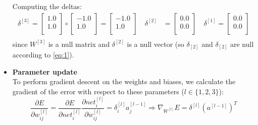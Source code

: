 \documentclass{exam}
\begin{document}
\begin{questions}
\begin{itemize}
\begin{equation}
                \label{eq:2}
            \end{equation}
            Computing the deltas:
            \begin{align*}
                \delta^{[3]} = 
                \begin{bmatrix}
                    1.0  \\
                    1.0 \\
                \end{bmatrix} \circ
                \begin{bmatrix}
                    -1.0  \\
                    1.0  \\
                \end{bmatrix} = 
                \begin{bmatrix}
                    -1.0  \\
                    1.0  \\
                \end{bmatrix} \quad
                \delta^{[2]} &= 
                \begin{bmatrix}
                    0.0  \\
                    0.0  \\
                \end{bmatrix} \quad
                \delta^{[1]} = 
                \begin{bmatrix}
                    0.0  \\
                    0.0  \\
                \end{bmatrix} \\
            \end{align*} 
            since $W^{[3]}$ is a null matrix and $\delta^{[2]}$ is a null vector (so $\delta_{[2]}$ and $\delta_{[2]}$ are null according to \eqref{eq:1}).
            \item \textbf{Parameter update} \\
            To perform gradient descent on the weights and biases, we calculate the gradient of the error with respect to these parameters ($l \in \{1, 2, 3\}$):
            \begin{equation}
                \frac{\partial E}{\partial w_{ij}^{[l]}} = \frac{\partial E}{\partial net_{i}^{[l]}} \frac{\partial net_i^{[l]}}{\partial w_{ij}^{[l]}} = \delta_i^{[l]} a_j^{[l - 1]} \Rightarrow \nabla_{W^{[l]}} E = \delta^{[l]} (a^{[l - 1]})^{T} \label{eq:3}
            \end{equation}

\end{itemize}
\end{questions}
\end{document}
